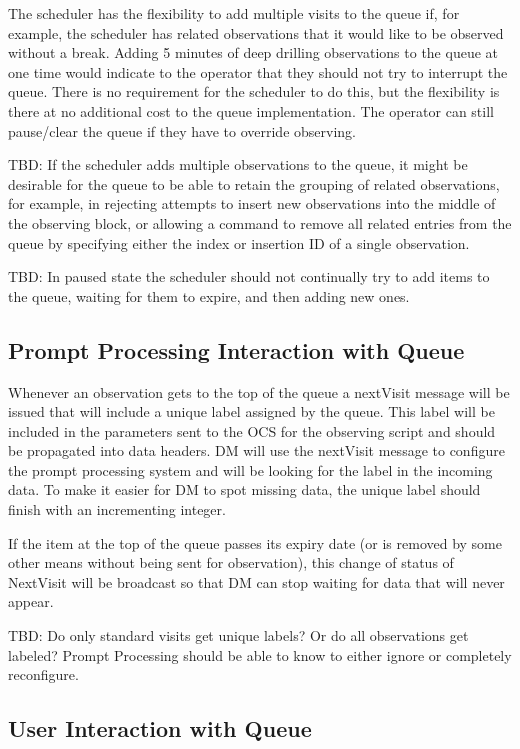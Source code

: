 \documentclass[TS,toc,lsstdraft]{lsstdoc}
\begin{document}
The scheduler has the flexibility to add multiple visits to the queue if, for example, the scheduler has related observations that it would like to be observed without a break.
Adding 5 minutes of deep drilling observations to the queue at one time would indicate to the operator that they should not try to interrupt the queue.
There is no requirement for the scheduler to do this, but the flexibility is there at no additional cost to the queue implementation.
The operator can still pause/clear the queue if they have to override observing.

TBD: If the scheduler adds multiple observations to the queue, it might be desirable for the queue to be able to retain the grouping of related observations, for example, in rejecting attempts to insert new observations into the middle of the observing block, or allowing a command to remove all related entries from the queue by specifying either the index or insertion ID of a single observation.

TBD: In paused state the scheduler should not continually try to add items to the queue, waiting for them to expire, and then adding new ones.

\subsection{Prompt Processing Interaction with Queue}

Whenever an observation gets to the top of the queue a nextVisit message will be issued that will include a unique label assigned by the queue.
This label will be included in the parameters sent to the OCS for the observing script and should be propagated into data headers.
DM will use the nextVisit message to configure the prompt processing system and will be looking for the label in the incoming data.
To make it easier for DM to spot missing data, the unique label should finish with an incrementing integer.

If the item at the top of the queue passes its expiry date (or is removed by some other means without being sent for observation), this change of status of NextVisit will be broadcast so that DM can stop waiting for data that will never appear.

TBD: Do only standard visits get unique labels? Or do all observations get labeled? Prompt Processing should be able to know to either ignore or completely reconfigure.

\subsection{User Interaction with Queue}
\end{document}
